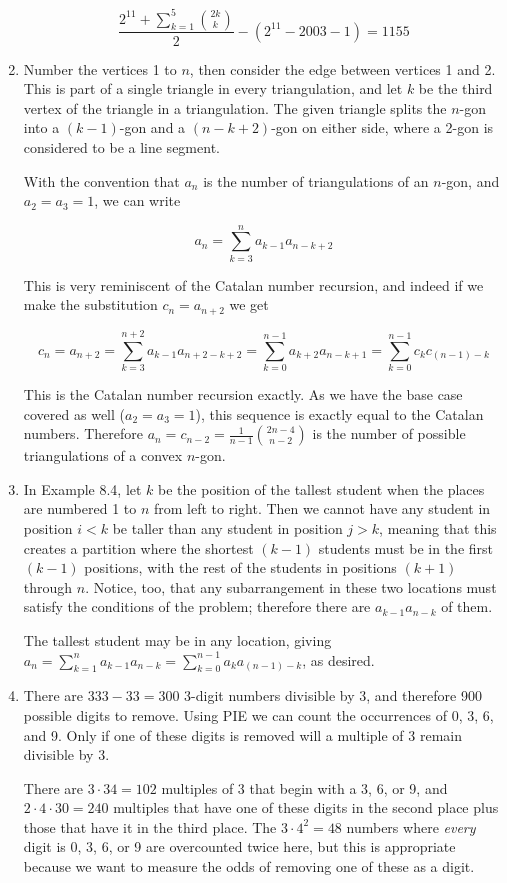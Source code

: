 \documentclass{book}
\numberwithin{equation}{section}
\begin{document}
\begin{enumerate}[label={9.\arabic*}]
$$\frac{2^{11} + \sum_{k=1}^{5} {2k \choose k}}{2} - (2^{11} - 2003 - 1) = 1155$$

\item
Number the vertices 1 to $n$, then consider the edge between vertices 1 and 2. This is part of a single triangle in every
triangulation, and let $k$ be the third vertex of the triangle in a triangulation. The given triangle splits the $n$-gon
into a $(k-1)$-gon and a $(n-k+2)$-gon on either side, where a 2-gon is considered to be a line segment.

With the convention that $a_n$ is the number of triangulations of an $n$-gon, and $a_2 = a_3 = 1$, we can write

$$a_n = \sum_{k=3}^n a_{k-1}a_{n-k+2}$$

This is very reminiscent of the Catalan number recursion, and indeed if we make the substitution $c_n = a_{n+2}$ we get

$$c_n = a_{n+2} = \sum_{k=3}^{n+2} a_{k-1}a_{n+2-k+2} = \sum_{k=0}^{n-1} a_{k+2}a_{n-k+1} = \sum_{k=0}^{n-1} c_k c_{(n-1)-k}$$

This is the Catalan number recursion exactly. As we have the base case covered as well ($a_2 = a_3 = 1$), this sequence is
exactly equal to the Catalan numbers. Therefore $a_n = c_{n-2} = \frac{1}{n-1}{2n-4 \choose n-2}$ is the number of possible
triangulations of a convex $n$-gon.

\item
In Example 8.4, let $k$ be the position of the tallest student when the places are numbered 1 to $n$ from left to right.
Then we cannot have any student in position $i < k$ be taller
than any student in position $j > k$, meaning that this creates a partition where the shortest $(k-1)$ students must be in the
first $(k-1)$ positions, with the rest of the students in positions $(k+1)$ through $n$. Notice, too, that any subarrangement
in these two locations must satisfy the conditions of the problem; therefore there are $a_{k-1}a_{n-k}$ of them.

The tallest student may be in any location, giving $a_n = \sum_{k=1}^n a_{k-1}a_{n-k} = \sum_{k=0}^{n-1} a_ka_{(n-1)-k}$,
as desired.

\item
There are $333 - 33 = 300$ 3-digit numbers divisible by 3, and therefore 900 possible digits to remove.
Using PIE we can count the occurrences of 0, 3, 6, and 9.
Only if one of these digits is removed will a multiple of 3 remain divisible by 3.

There are $3\cdot 34 = 102$ multiples of 3 that begin with a 3, 6, or 9, and $2\cdot4\cdot 30 =  240$ multiples that have
one of these digits in the second place plus those that have it in the third place. The $3 \cdot 4^2 = 48$ numbers where
\emph{every} digit is 0, 3, 6, or 9 are overcounted twice here, but this is appropriate because we want to measure the
odds of removing one of these as a digit.


\end{enumerate}
\end{document}
